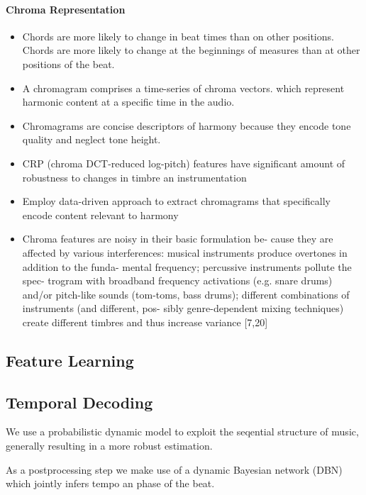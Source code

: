 \documentclass{scrartcl}
\begin{document}
\paragraph{Chroma Representation}

\begin{itemize}
\item Chords are more likely to change in beat times than on other positions. Chords are more likely to change at the beginnings of measures than at other positions of the beat.
\item A chromagram comprises a time-series of chroma vectors. which represent harmonic content at a specific time in the audio.
\item Chromagrams are concise descriptors of harmony because they encode tone quality and neglect tone height.
\item CRP (chroma DCT-reduced log-pitch) features have significant amount of robustness to changes in timbre an instrumentation \cite[Mueller2010]{Mueller2010}
\item Employ data-driven approach to extract chromagrams that specifically encode content relevant to harmony 
\item Chroma features are noisy in their basic formulation be- cause they are affected by various interferences: musical instruments produce overtones in addition to the funda- mental frequency; percussive instruments pollute the spec- trogram with broadband frequency activations (e.g. snare drums) and/or pitch-like sounds (tom-toms, bass drums); different combinations of instruments (and different, pos- sibly genre-dependent mixing techniques) create different timbres and thus increase variance [7,20] \cite{Korzeniowski2016}
\end{itemize}


\subsection{Feature Learning}



\subsection{Temporal Decoding}
\label{sec:temporal_decoding}

We use a probabilistic dynamic model to exploit the seqential structure of music, generally resulting in a more robust estimation.

As a postprocessing step we make use of a dynamic Bayesian network (DBN) which jointly infers tempo an phase of the beat.
\end{document}
